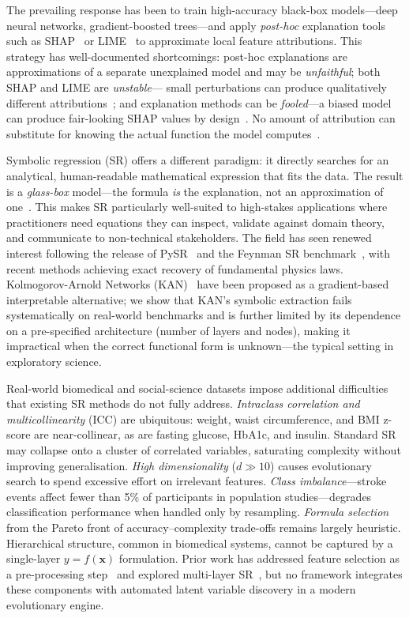 \documentclass[10pt,twocolumn]{article}
\begin{document}
The prevailing response has been to train high-accuracy black-box models—deep
neural networks, gradient-boosted trees—and apply \emph{post-hoc} explanation
tools such as SHAP~\citep{lundberg2017unified} or LIME~\citep{ribeiro2016why}
to approximate local feature attributions.  This strategy has well-documented
shortcomings: post-hoc explanations are approximations of a separate unexplained
model and may be \emph{unfaithful}; both SHAP and LIME are \emph{unstable}—
small perturbations can produce qualitatively different attributions~\citep{alvarez2018robustness};
and explanation methods can be \emph{fooled}—a biased model can produce
fair-looking SHAP values by design~\citep{slack2020fooling}.  No amount of
attribution can substitute for knowing the actual function the model
computes~\citep{rudin2019stop}.

Symbolic regression (SR) offers a different paradigm: it directly searches for
an analytical, human-readable mathematical expression that fits the data.  The
result is a \emph{glass-box} model—the formula \emph{is} the explanation, not
an approximation of one~\citep{koza1994genetic,cranmer2023interpretable}.
This makes SR particularly well-suited to high-stakes applications where
practitioners need equations they can inspect, validate against domain theory,
and communicate to non-technical stakeholders.  The field has seen renewed
interest following the release of PySR~\citep{cranmer2023interpretable} and
the Feynman SR benchmark~\citep{udrescu2020ai}, with recent methods achieving
exact recovery of fundamental physics laws.  Kolmogorov-Arnold Networks
(KAN)~\citep{liu2024kan} have been proposed as a gradient-based interpretable
alternative; we show that KAN's symbolic extraction fails systematically on
real-world benchmarks and is further limited by its dependence on a
pre-specified architecture (number of layers and nodes), making it impractical
when the correct functional form is unknown—the typical setting in exploratory
science.

Real-world biomedical and social-science datasets impose additional difficulties
that existing SR methods do not fully address.  \emph{Intraclass correlation
and multicollinearity} (ICC) are ubiquitous: weight, waist circumference, and
BMI z-score are near-collinear, as are fasting glucose, HbA1c, and insulin.
Standard SR may collapse onto a cluster of correlated variables, saturating
complexity without improving generalisation.  \emph{High dimensionality}
($d \gg 10$) causes evolutionary search to spend excessive effort on irrelevant
features.  \emph{Class imbalance}—stroke events affect fewer than 5\% of
participants in population studies—degrades classification performance when
handled only by resampling.  \emph{Formula selection} from the Pareto front
of accuracy–complexity trade-offs remains largely heuristic.  Hierarchical
structure, common in biomedical systems, cannot be captured by a single-layer
$y = f(\mathbf{x})$ formulation.  Prior work has addressed feature selection
as a pre-processing step~\citep{hein2018interpretable,virgolin2020improving}
and explored multi-layer SR~\citep{kim2020integration}, but no framework
integrates these components with automated latent variable discovery in a
modern evolutionary engine.
\end{document}
